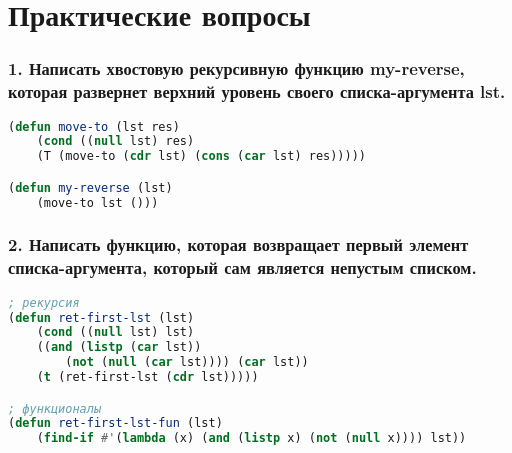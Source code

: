 \section*{Практические вопросы}


\subsubsection*{1. Написать хвостовую рекурсивную функцию my-reverse, которая развернет верхний	уровень своего списка-аргумента lst.}
\begin{lstlisting}[language=Lisp]
(defun move-to (lst res)
	(cond ((null lst) res)
	(T (move-to (cdr lst) (cons (car lst) res)))))

(defun my-reverse (lst)
	(move-to lst ()))
\end{lstlisting}


\subsubsection*{2. Написать функцию, которая возвращает первый элемент списка-аргумента, который сам является непустым списком.}

\begin{lstlisting}[language=Lisp]
; рекурсия
(defun ret-first-lst (lst)
	(cond ((null lst) lst)
	((and (listp (car lst)) 
		(not (null (car lst)))) (car lst))
	(t (ret-first-lst (cdr lst)))))

; функционалы
(defun ret-first-lst-fun (lst)
	(find-if #'(lambda (x) (and (listp x) (not (null x)))) lst))
\end{lstlisting}

\newpage
